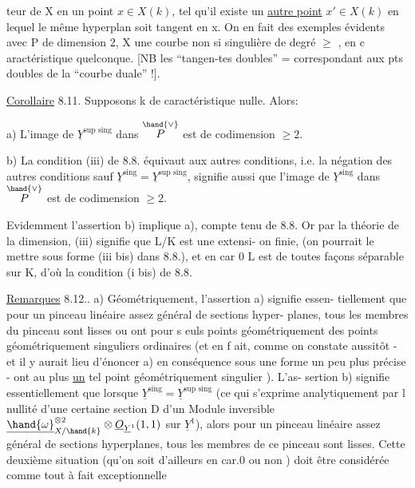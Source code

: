 
teur de X en un point $x\in X(k)$,  tel qu'il existe un \uline{autre point}
$x'\in X(k)$ en lequel le même hyperplan soit tangent en x. On en fait des
exemples évidents avec  P de dimension 2, X une courbe non si
singulière de degré $\geqslant$  , en c aractéristique quelconque. [NB les ``tangen-tes doubles'' =  correspondant aux pts doubles de la ``courbe duale'' !].

\uline{Corollaire} 8.11. Supposons k de caractéristique nulle. Alors:

a) L'image de $\underline{Y}^{\text{sup sing}}$ dans $\overset{\hand{\vee}}{P}$ est de codimension $\geqslant 2$.

b) La condition (iii) de 8.8. équivaut aux autres conditions, i.e.
la négation des autres conditions\hand{,} sauf $\underline{Y}^{\text{sing}}=\underline{Y}^{\text{sup sing}}$, signifie aussi que l'image de $\underline{Y}^{\text{sing}}$
dans $\overset{\hand{\vee}}{P}$ est de codimension $\geqslant 2$.

Evidemment l'assertion b) implique a), compte tenu de 8.8. Or
par la théorie de la dimension, (iii) signifie que L/K est une extensi-%
on finie,  (on pourrait le mettre sous forme (iii bis) dans 8.8.),
et en car 0  L est de toutes façons séparable sur K, d'où
la condition (i bis) de 8.8.

\uline{Remarques} 8.12.. a) Géométriquement, l'assertion a) signifie essen-%
tiellement que pour un pinceau linéaire assez général de sections hyper-%
planes, tous les membres du pinceau sont lisses ou ont 
 pour s euls points géométriquement des points géométriquement
singuliers ordinaires (et en f ait, comme on constate aussitôt - et il
y aurait lieu d'énoncer a) en conséquence sous une forme un peu plus
précise - ont au plus \uline{un} tel point géométriquement singulier ). L'as-%
sertion b) signifie essentiellement que lorsque $\underline{Y}^{\text{sing}}=\underline{Y}^{\text{sup sing}}$ (ce qui s'exprime
analytiquement par l nullité d'une certaine section D d'un Module
inversible $\underline{\hand{\omega}}^{\otimes 2}_{X/\hand{k}}\otimes\underline{O}_{\underline{Y}^1}(1,1)$ sur $\underline{Y}^1$), alors pour un pinceau linéaire
assez général de sections hyperplanes, tous les membres de ce 
pinceau sont lisses. Cette deuxième situation (qu'on soit d'ailleurs
en car.0 ou non ) doit être considérée comme tout à fait exceptionnelle

